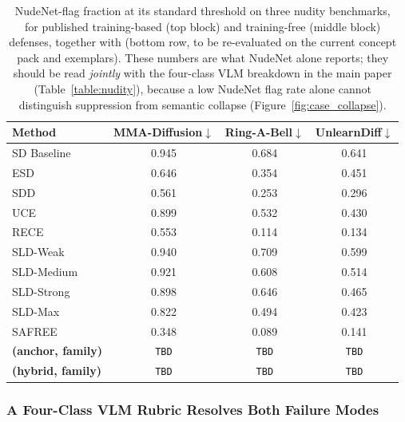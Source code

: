 \begin{table}[h]
\centering
\renewcommand{\arraystretch}{1.15}
\setlength{\tabcolsep}{0.6em}
\caption{NudeNet-flag fraction at its standard threshold on three nudity benchmarks, for published training-based (top block) and training-free (middle block) defenses, together with \ours{} (bottom row, to be re-evaluated on the current concept pack and exemplars). These numbers are what NudeNet alone reports; they should be read \emph{jointly} with the four-class VLM breakdown in the main paper (Table~\ref{table:nudity}), because a low NudeNet flag rate alone cannot distinguish suppression from semantic collapse (Figure~\ref{fig:case_collapse}).}
\label{table:nudenet_flagrate}
\small
\begin{tabular}{@{}lccc@{}}
\toprule
\textbf{Method} & \textbf{MMA-Diffusion}$\downarrow$ & \textbf{Ring-A-Bell}$\downarrow$ & \textbf{UnlearnDiff}$\downarrow$ \\
\midrule
SD Baseline                & 0.945 & 0.684 & 0.641 \\
\midrule
ESD~\citep{gandikota2023erasing}    & 0.646 & 0.354 & 0.451 \\
SDD~\citep{kim2023towards}          & 0.561 & 0.253 & 0.296 \\
UCE~\citep{gandikota2024unified}    & 0.899 & 0.532 & 0.430 \\
RECE~\citep{gong2024reliable}       & 0.553 & 0.114 & 0.134 \\
\midrule
SLD-Weak~\citep{schramowski2023safe}    & 0.940 & 0.709 & 0.599 \\
SLD-Medium~\citep{schramowski2023safe}  & 0.921 & 0.608 & 0.514 \\
SLD-Strong~\citep{schramowski2023safe}  & 0.898 & 0.646 & 0.465 \\
SLD-Max~\citep{schramowski2023safe}     & 0.822 & 0.494 & 0.423 \\
SAFREE~\citep{yoon2024safree}           & 0.348 & 0.089 & 0.141 \\
\midrule
\rowcolor{blue!8} \textbf{\ours{} (anchor, family)} & \texttt{TBD} & \texttt{TBD} & \texttt{TBD} \\
\rowcolor{blue!8} \textbf{\ours{} (hybrid, family)} & \texttt{TBD} & \texttt{TBD} & \texttt{TBD} \\
\bottomrule
\end{tabular}
\end{table}

\subsubsection{A Four-Class VLM Rubric Resolves Both Failure Modes}
\label{app:evaluator_vlm}

